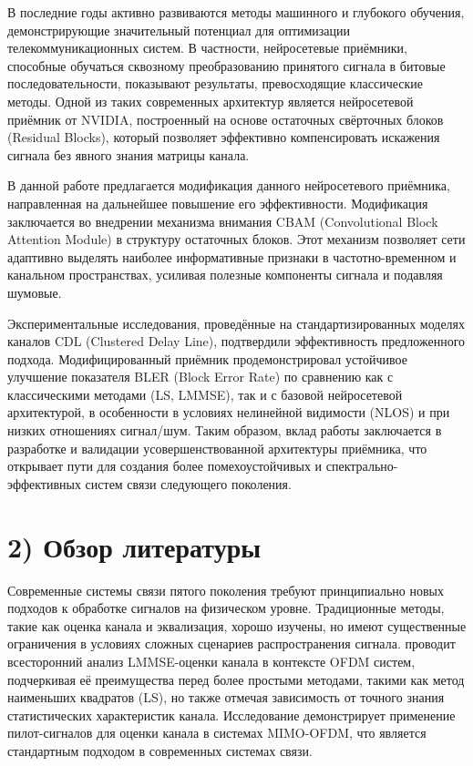 \documentclass{article}
\begin{document}
В последние годы активно развиваются методы машинного и глубокого обучения, демонстрирующие значительный потенциал для оптимизации телекоммуникационных систем. В частности, нейросетевые приёмники, способные обучаться сквозному преобразованию принятого сигнала в битовые последовательности, показывают результаты, превосходящие классические методы. Одной из таких современных архитектур является нейросетевой приёмник от NVIDIA, построенный на основе остаточных свёрточных блоков (Residual Blocks), который позволяет эффективно компенсировать искажения сигнала без явного знания матрицы канала.

В данной работе предлагается модификация данного нейросетевого приёмника, направленная на дальнейшее повышение его эффективности. Модификация заключается во внедрении механизма внимания CBAM (Convolutional Block Attention Module) в структуру остаточных блоков. Этот механизм позволяет сети адаптивно выделять наиболее информативные признаки в частотно-временном и канальном пространствах, усиливая полезные компоненты сигнала и подавляя шумовые.

Экспериментальные исследования, проведённые на стандартизированных моделях каналов CDL (Clustered Delay Line), подтвердили эффективность предложенного подхода. Модифицированный приёмник продемонстрировал устойчивое улучшение показателя BLER (Block Error Rate) по сравнению как с классическими методами (LS, LMMSE), так и с базовой нейросетевой архитектурой, в особенности в условиях нелинейной видимости (NLOS) и при низких отношениях сигнал/шум. Таким образом, вклад работы заключается в разработке и валидации усовершенствованной архитектуры приёмника, что открывает пути для создания более помехоустойчивых и спектрально-эффективных систем связи следующего поколения.

\section*{2) Обзор литературы}

Современные системы связи пятого поколения требуют принципиально новых подходов к обработке сигналов на физическом уровне. Традиционные методы, такие как оценка канала и эквализация, хорошо изучены, но имеют существенные ограничения в условиях сложных сценариев распространения сигнала. \citet{badr2019lmmse} проводит всесторонний анализ LMMSE-оценки канала в контексте OFDM систем, подчеркивая её преимущества перед более простыми методами, такими как метод наименьших квадратов (LS), но также отмечая зависимость от точного знания статистических характеристик канала. Исследование \citet{bagadi2010mimo} демонстрирует применение пилот-сигналов для оценки канала в системах MIMO-OFDM, что является стандартным подходом в современных системах связи.
\end{document}

